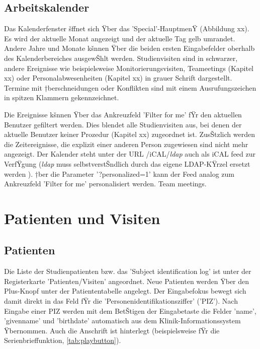 \documentclass[11pt,oneside]{scrbook}
\begin{document}
\section{Arbeitskalender}
\label{chap:calendar}
Das Kalenderfenster šffnet sich Ÿber das 'Special'-HauptmenŸ  (Abbildung xx). Es wird der aktuelle Monat angezeigt und der aktuelle Tag  gelb umrandet. Andere Jahre und Monate kšnnen Ÿber die beiden ersten Eingabefelder oberhalb des Kalenderbereiches ausgewŠhlt werden.
Studienvisiten sind in schwarzer, andere Ereignisse wie beispielsweise Monitorierungsvisiten, Teameetings (Kapitel xx) oder Personalabwesenheiten (Kapitel xx) in  grauer Schrift dargestellt. Termine mit †berschneidungen oder Konflikten sind mit einem Ausrufungszeichen in spitzen Klammern gekennzeichnet.

 Die   Ereignisse kšnnen Ÿber das Ankreuzfeld 'Filter for me'  fŸr  den aktuellen Benutzer gefiltert werden. Dies blendet alle Studienvisiten aus, bei denen der aktuelle Benutzer keiner Prozedur (Kapitel xx)  zugeordnet ist. ZusŠtzlich werden die Zeitereignisse, die explizit einer anderen Person zugewiesen sind nicht mehr angezeigt.  Der Kalender steht unter der URL /iCAL/{\it ldap} auch als iCAL feed zur VerfŸgung ({\it ldap}  muss selbstverstŠndlich durch das eigene LDAP-KŸrzel ersetzt werden ). †ber die Parameter '?personalized=1' kann der Feed analog zum  Ankreuzfeld 'Filter for me' personalisiert werden. %
Team meetings.





\chapter{Patienten und Visiten}
\section{Patienten}
Die Liste der Studienpatienten bzw. das 'Subject identification log'   ist unter der Registerkarte 'Patienten/Visiten' angeordnet. Neue Patienten werden Ÿber den Plus-Knopf unter der Patiententabelle angelegt. Der Eingabefokus bewegt sich damit  direkt in das Feld fŸr die 'Personenidentifikationsziffer' ('PIZ'). Nach Eingabe einer  PIZ werden mit dem BetŠtigen der Eingabetaste die Felder 'name', 'givenname' und 'birthdate' automatisch aus dem Klinik-Informationssystem Ÿbernommen. Auch die Anschrift ist hinterlegt (beispielsweise fŸr die Serienbrieffunktion, \ref{tab:playbutton}).
\end{document}
